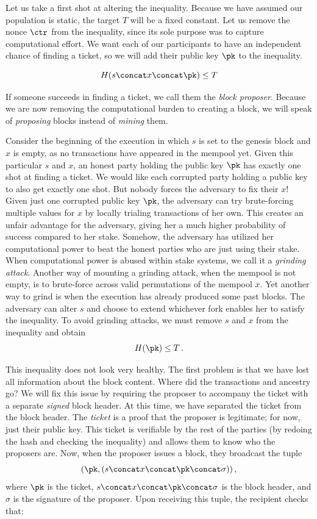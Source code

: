 Let us take a first shot at altering the inequality. Because we have assumed our population
is static, the target $T$ will be a fixed constant. Let us remove the nonce $\ctr$ from the inequality,
since its sole purpose was to capture computational effort. We want each of our participants
to have an independent chance of finding a ticket, so we will add their public key $\pk$ to the
inequality.

\[
  H(s \concat x \concat \pk) \leq T
\]

If someone succeeds in finding a ticket, we call them the \emph{block proposer}.
Because we are now removing the computational burden to creating a block, we will speak of
\emph{proposing} blocks instead of \emph{mining} them.

Consider the beginning of the execution in which $s$ is set to the genesis block and $x$ is empty,
as no transactions have appeared in the mempool yet. Given this particular $s$ and $x$, an honest
party holding the public key $\pk$ has exactly one
shot at finding a ticket. We would like each corrupted party holding a public key to also get
exactly one shot. But nobody forces the adversary to fix their $x$! Given just one
corrupted public key $\pk$, the adversary can try brute-forcing multiple values for $x$
by locally trialing transactions of her own. This creates an unfair advantage for the adversary,
giving her a much higher probability of success compared to her stake. Somehow, the adversary
has utilized her computational power to beat the honest parties who are just using their stake.
When computational power is abused within stake systems, we call it a
\emph{grinding attack}. Another way of mounting a grinding attack, when
the mempool is not empty, is to brute-force across valid permutations of the mempool $\overline{x}$.
Yet another way to grind is when the execution has already produced some past blocks.
The adversary can alter $s$ and choose to extend whichever fork enables her to satisfy the inequality.
To avoid grinding attacks, we must remove $s$ and $x$ from the inequality and obtain
\[
  H(\pk) \leq T\,.
\]

This inequality does not look very healthy. The first problem is that we have lost all information about the block
content. Where did the transactions and ancestry go? We will fix this issue by requiring
the proposer to accompany the ticket with a separate \emph{signed} block header.
At this time, we have separated the ticket from the block header.
The \emph{ticket} is a proof that the proposer is legitimate; for now, just their
public key. This ticket is verifiable by the rest of the parties (by redoing the hash and checking
the inequality) and allows them to know who the proposers are. Now, when the proposer issues a block,
they broadcast the tuple
\[
(\pk, (s \concat x \concat \pk \concat \sigma))\,,
\]
where $\pk$ is the ticket, $s \concat x \concat \pk \concat \sigma$ is the block header,
and $\sigma$ is the signature of the proposer. Upon receiving this tuple, the recipient checks
that:

